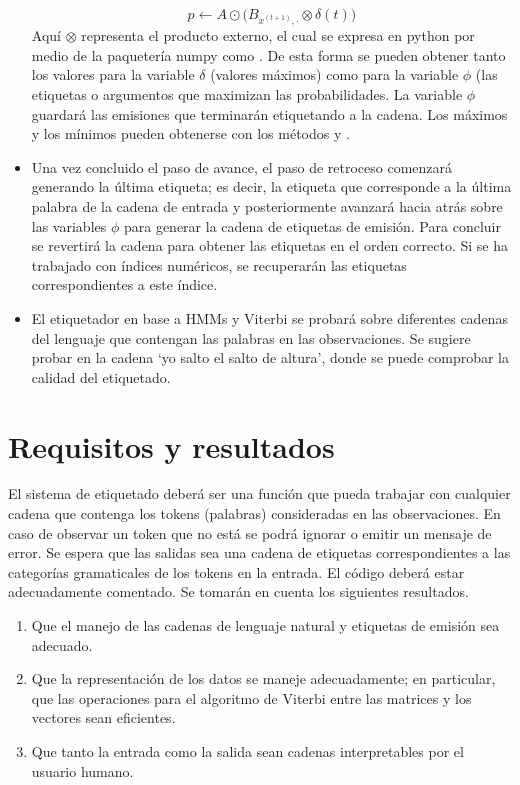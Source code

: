 \begin{itemize}
    $$p\leftarrow A \odot \Big( B_{x^{(t+1)}, \cdot} \otimes \delta(t) \Big)$$
    Aquí $\otimes$ representa el producto externo, el cual se expresa en python por medio de la paquetería numpy como .  De esta forma se pueden obtener tanto los valores para la variable $\delta$ (valores máximos) como para la variable $\phi$ (las etiquetas o argumentos que maximizan las probabilidades. La variable $\phi$ guardará las emisiones que terminarán etiquetando a la cadena. Los máximos y los mínimos pueden obtenerse con los métodos  y .
    \item Una vez concluido el paso de avance, el paso de retroceso comenzará generando la última etiqueta; es decir, la etiqueta que corresponde a la última palabra de la cadena de entrada y posteriormente avanzará hacia atrás sobre las variables $\phi$ para generar la cadena de etiquetas de emisión. Para concluir se revertirá la cadena para obtener las etiquetas en el orden correcto. Si se ha trabajado con índices numéricos, se recuperarán las etiquetas correspondientes a este índice.
    \item El etiquetador en base a HMMs y Viterbi se probará sobre diferentes cadenas del lenguaje que contengan las palabras en las observaciones. Se sugiere probar en la cadena `yo salto el salto de altura', donde se puede comprobar la calidad del etiquetado. 
\end{itemize}


\section{Requisitos y resultados}

El sistema de etiquetado deberá ser una función que pueda trabajar con cualquier cadena que contenga los tokens (palabras) consideradas en las observaciones. En caso de observar un token que no está se podrá ignorar o emitir un mensaje de error. Se espera que las salidas sea una cadena de etiquetas correspondientes a las categorías gramaticales de los tokens en la entrada. El código deberá estar adecuadamente comentado. Se tomarán en cuenta los siguientes resultados.

\begin{enumerate}
 \item Que el manejo de las cadenas de lenguaje natural y etiquetas de emisión sea adecuado.
 \item Que la representación de los datos se maneje adecuadamente; en particular, que las operaciones para el algoritmo de Viterbi entre las matrices y los vectores sean eficientes.
 \item Que tanto la entrada como la salida sean cadenas interpretables por el usuario humano.
\end{enumerate}
